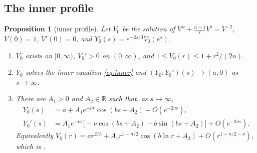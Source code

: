 \documentclass[11pt,a4paper]{amsart}
\newtheorem{proposition}[theorem]{Proposition}
\theoremstyle{definition}
\theoremstyle{remark}
\newcommand{\R}{\mathbb{R}}
\renewcommand{\theenumi}{\roman{enumi}}
\newenvironment{alphenum}{\begin{enumerate}\renewcommand{\theenumi}{\alph{enumi}}}{\end{enumerate}}
\begin{document}
\subsection{The inner profile}
\begin{proposition}[inner profile]\label{prop:inner}
Let $V_0$ be the solution of $V''+\frac{n-1}rV'=V^{-2}$, $V(0)=1$, $V'(0)=0$, and $Y_0(s)=e^{-2s/3}V_0(e^s)$.
\begin{alphenum}
\item $V_0$ exists on $[0,\infty)$, $V_0'>0$ on $(0,\infty)$, and $1\le V_0(r)\le1+r^2/(2n)$.
\item $Y_0$ solves the inner equation \eqref{eq:inner} and $(Y_0,Y_0')(s)\to(a,0)$ as $s\to\infty$.
\item There are $A_1>0$ and $A_2\in\R$ such that, as $s\to\infty$,
\begin{equation}\label{eq:inner-tail}
\begin{aligned}
Y_0(s)&=a+A_1e^{-\nu s}\cos(bs+A_2)+O(e^{-2\nu s}),\\
Y_0'(s)&=A_1e^{-\nu s}\big[-\nu\cos(bs+A_2)-b\sin(bs+A_2)\big]+O(e^{-2\nu s}).
\end{aligned}
\end{equation}
Equivalently $V_0(r)=ar^{2/3}+A_1r^{1-n/2}\cos(b\ln r+A_2)+O(r^{1-n/2-\nu})$, which is \cite[(2.21)]{GHL22}.
\end{alphenum}
\end{proposition}
\end{document}

